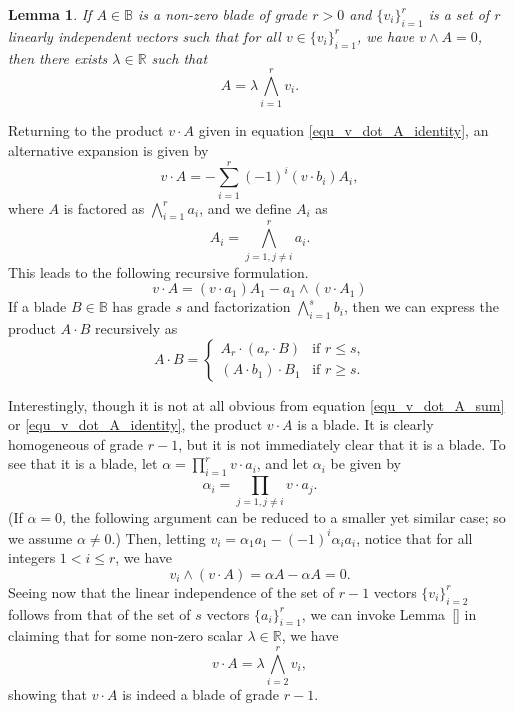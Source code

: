 \documentclass{birkjour}
\newtheorem{lem}[thm]{Lemma}
\theoremstyle{definition}
\theoremstyle{remark}
\numberwithin{equation}{section}
\newcommand{\R}{\mathbb{R}}
\newcommand{\B}{\mathbb{B}}
\begin{document}
\begin{lem}
If $A\in\B$ is a non-zero blade of grade $r>0$ and $\{v_i\}_{i=1}^r$ is a set
of $r$ linearly independent vectors such that for all $v\in\{v_i\}_{i=1}^r$,
we have $v\wedge A=0$, then there exists $\lambda\in\R$ such that
\begin{equation*}
A = \lambda\bigwedge_{i=1}^r v_i.
\end{equation*}
\end{lem}

Returning to the product $v\cdot A$ given in equation \eqref{equ_v_dot_A_identity},
an alternative expansion is given by
\begin{equation}\label{equ_v_dot_A_sum}
v\cdot A = -\sum_{i=1}^r (-1)^i(v\cdot b_i)A_i,
\end{equation}
where $A$ is factored as $\bigwedge_{i=1}^r a_i$, and we define $A_i$ as
\begin{equation*}
A_i = \bigwedge_{j=1,j\neq i}^r a_i.
\end{equation*}
This leads to the following recursive formulation.
\begin{equation*}
v\cdot A=(v\cdot a_1)A_1-a_1\wedge(v\cdot A_1)
\end{equation*}
If a blade $B\in\B$ has grade $s$ and factorization $\bigwedge_{i=1}^s b_i$, then
we can express the product $A\cdot B$ recursively as
\begin{equation*}
A\cdot B = \left\{\begin{array}{ll}
A_r\cdot (a_r\cdot B) & \mbox{if $r\leq s$,} \\
(A\cdot b_1)\cdot B_1 & \mbox{if $r\geq s$.}
\end{array}\right.
\end{equation*}

Interestingly, though it is not at all obvious from equation \eqref{equ_v_dot_A_sum}
or \eqref{equ_v_dot_A_identity}, the product
$v\cdot A$ is a blade.  It is clearly homogeneous of grade $r-1$, but it is not
immediately clear that it is a blade.  To see that it is a blade, let $\alpha=\prod_{i=1}^r v\cdot a_i$,
and let $\alpha_i$ be given by
\begin{equation*}
\alpha_i=\prod_{j=1,j\neq i}v\cdot a_j.
\end{equation*}
(If $\alpha=0$, the following argument can be reduced to a smaller yet similar case; so
we assume $\alpha\neq 0$.)
Then, letting $v_i=\alpha_1a_1-(-1)^i\alpha_ia_i$, notice that for all integers $1<i\leq r$,
we have
\begin{equation*}
v_i\wedge (v\cdot A)=\alpha A-\alpha A=0.
\end{equation*}
Seeing now that the linear independence of the set of $r-1$ vectors
$\{v_i\}_{i=2}^r$ follows from that of the set of $s$ vectors $\{a_i\}_{i=1}^r$,
we can invoke Lemma~\ref{} in claiming that for some non-zero scalar $\lambda\in\R$,
we have
\begin{equation*}
v\cdot A = \lambda\bigwedge_{i=2}^r v_i,
\end{equation*}
showing that $v\cdot A$ is indeed a blade of grade $r-1$.
\end{document}
